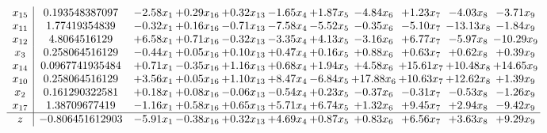 \documentclass[9pt]{article}
\begin{document}
\[\begin{array}{c| c c@{\hskip 2pt} c@{\hskip 2pt} c@{\hskip 2pt} c@{\hskip 2pt} c@{\hskip 2pt} c@{\hskip 2pt} c@{\hskip 2pt} c@{\hskip 2pt} c@{\hskip 2pt} }
 x_{15}   &  0.193548387097 & -2.58 x_{1} & +  0.29 x_{16} & +  0.32 x_{13} & -1.65 x_{4} & +  1.87 x_{5} & -4.84 x_{6} & +  1.23 x_{7} & -4.03 x_{8} & -3.71 x_{9}\\
 x_{11}   &  1.77419354839 & -0.32 x_{1} & +  0.16 x_{16} & -0.71 x_{13} & -7.58 x_{4} & -5.52 x_{5} & -0.35 x_{6} & -5.10 x_{7} & -13.13 x_{8} & -1.84 x_{9}\\
 x_{12}   &  4.8064516129 & +  6.58 x_{1} & +  0.71 x_{16} & -0.32 x_{13} & -3.35 x_{4} & +  4.13 x_{5} & -3.16 x_{6} & +  6.77 x_{7} & -5.97 x_{8} & -10.29 x_{9}\\
 x_{3}   &  0.258064516129 & -0.44 x_{1} & +  0.05 x_{16} & +  0.10 x_{13} & +  0.47 x_{4} & +  0.16 x_{5} & +  0.88 x_{6} & +  0.63 x_{7} & +  0.62 x_{8} & +  0.39 x_{9}\\
 x_{14}   &  0.0967741935484 & +  0.71 x_{1} & -0.35 x_{16} & +  1.16 x_{13} & +  0.68 x_{4} & +  1.94 x_{5} & +  4.58 x_{6} & + 15.61 x_{7} & + 10.48 x_{8} & + 14.65 x_{9}\\
 x_{10}   &  0.258064516129 & +  3.56 x_{1} & +  0.05 x_{16} & +  1.10 x_{13} & +  8.47 x_{4} & -6.84 x_{5} & + 17.88 x_{6} & + 10.63 x_{7} & + 12.62 x_{8} & +  1.39 x_{9}\\
 x_{2}   &  0.161290322581 & +  0.18 x_{1} & +  0.08 x_{16} & -0.06 x_{13} & -0.54 x_{4} & +  0.23 x_{5} & -0.37 x_{6} & -0.31 x_{7} & -0.53 x_{8} & -1.26 x_{9}\\
 x_{17}   &  1.38709677419 & -1.16 x_{1} & +  0.58 x_{16} & +  0.65 x_{13} & +  5.71 x_{4} & +  6.74 x_{5} & +  1.32 x_{6} & +  9.45 x_{7} & +  2.94 x_{8} & -9.42 x_{9}\\
\hline
z    &  -0.806451612903 & -5.91 x_{1} & -0.38 x_{16} & +  0.32 x_{13} & +  4.69 x_{4} & +  0.87 x_{5} & +  0.83 x_{6} & +  6.56 x_{7} & +  3.63 x_{8} & +  9.29 x_{9}\\
\end{array}\]
\end{document}

